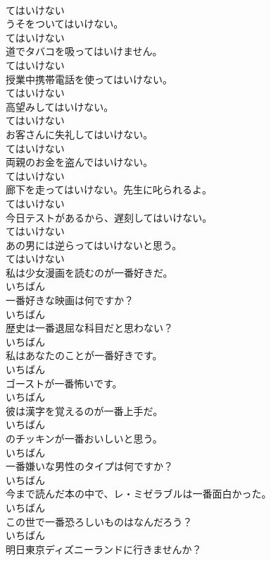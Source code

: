 \documentclass[8pt]{extreport}
\begin{document}
\begin{CJK}{UTF8}{min}
\\	てはいけない
\\	うそをついてはいけない。	
\\	てはいけない
\\	道でタバコを吸ってはいけません。	
\\	てはいけない
\\	授業中携帯電話を使ってはいけない。	
\\	てはいけない
\\	高望みしてはいけない。	
\\	てはいけない
\\	お客さんに失礼してはいけない。	
\\	てはいけない
\\	両親のお金を盗んではいけない。	
\\	てはいけない
\\	廊下を走ってはいけない。先生に叱られるよ。	
\\	てはいけない
\\	今日テストがあるから、遅刻してはいけない。	
\\	てはいけない
\\	あの男には逆らってはいけないと思う。	
\\	てはいけない
\\	私は少女漫画を読むのが一番好きだ。	
\\	いちばん
\\	一番好きな映画は何ですか？	
\\	いちばん
\\	歴史は一番退屈な科目だと思わない？	
\\	いちばん
\\	私はあなたのことが一番好きです。	
\\	いちばん
\\	ゴーストが一番怖いです。	
\\	いちばん
\\	彼は漢字を覚えるのが一番上手だ。	
\\	いちばん
\\	のチッキンが一番おいしいと思う。	
\\	いちばん
\\	一番嫌いな男性のタイプは何ですか？	
\\	いちばん
\\	今まで読んだ本の中で、レ・ミゼラブルは一番面白かった。	
\\	いちばん
\\	この世で一番恐ろしいものはなんだろう？	
\\	いちばん
\\	明日東京ディズニーランドに行きませんか？	

\end{CJK}
\end{document}
